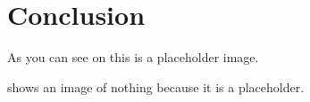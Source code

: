 \chapter{Conclusion}\label{chap:conclusion}

As you can see on  this is a placeholder image.


 shows an image of nothing because it is a placeholder.